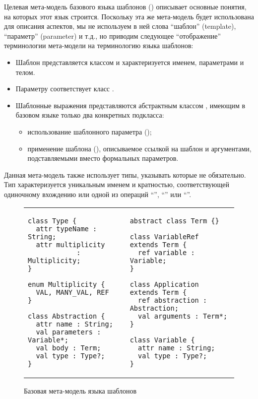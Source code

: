 
Целевая мета-модель базового языка шаблонов () описывает основные понятия, на которых этот язык строится. Поскольку эта же мета-модель будет использована для описания аспектов, мы не используем в ней слова ``шаблон'' (template), ``параметр'' (parameter) и т.д., но приводим следующее ``отображение'' терминологии мета-модели на терминологию языка шаблонов:
\begin{itemize}
\item Шаблон представляется классом  и характеризуется именем, параметрами и телом.
\item Параметру соответствует класс .
\item Шаблонные выражения представляются абстрактным классом , имеющим в базовом языке только два конкретных подкласса:
	\begin{itemize}
	\item использование шаблонного параметра ();
	\item применение шаблона (), описываемое ссылкой на шаблон и аргументами, подставляемыми вместо формальных параметров.
	\end{itemize}
\end{itemize}
Данная мета-модель также использует типы, указывать которые не обязательно. Тип характеризуется уникальным именем и кратностью, соответствующей одиночному вхождению или одной из операций ``'', ``\code{*}'' или ``\code{+}''.

\begin{figure}[htbp]
	\centering
\begin{tabular}{p{}p{}}
\begin{lstlisting}[xleftmargin=0cm]
class Type {
  attr typeName : String;
  attr multiplicity 
  			: Multiplicity;
}

enum Multiplicity {
  VAL, MANY_VAL, REF
}

class Abstraction {
  attr name : String;
  val parameters : Variable*;
  val body : Term;
  val type : Type?;
}

\end{lstlisting}
&
\begin{lstlisting}[xleftmargin=0cm]
abstract class Term {}

class VariableRef extends Term {
  ref variable : Variable;
}

class Application extends Term {
  ref abstraction : Abstraction;
  val arguments : Term*;
}

class Variable {
  attr name : String;
  val type : Type?;
}
\end{lstlisting}
\end{tabular}
	\caption{Базовая мета-модель языка шаблонов}\label{TempMM}
\end{figure}


